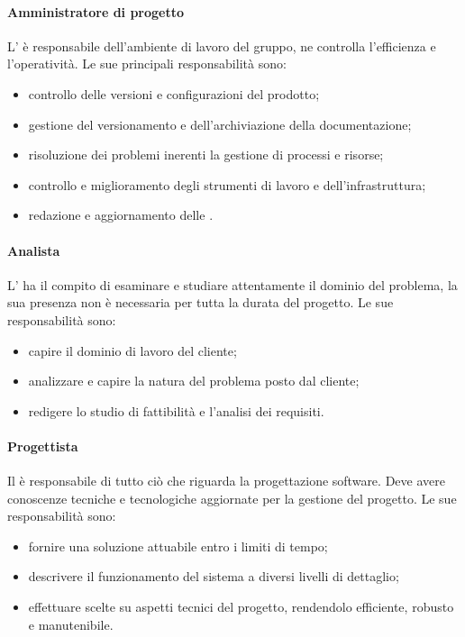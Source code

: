 			\paragraph{Amministratore di progetto}
			L'\amministratore{} è responsabile dell'ambiente di lavoro del gruppo, ne controlla l'efficienza e l'operatività.
			Le sue principali responsabilità sono:
			\begin{itemize}
				\item controllo delle versioni e configurazioni del prodotto;
				\item gestione del versionamento e dell'archiviazione della documentazione;
				\item risoluzione dei problemi inerenti la gestione di processi e risorse;
				\item controllo e miglioramento degli strumenti di lavoro e dell'infrastruttura;
				\item redazione e aggiornamento delle \ndp{}.
			\end{itemize}
			\paragraph{Analista}
			L'\analista{} ha il compito di esaminare e studiare attentamente il dominio del problema, la sua presenza non è necessaria per tutta la durata del progetto.
			Le sue responsabilità sono:
			\begin{itemize}
				\item capire il dominio di lavoro del cliente;
				\item analizzare e capire la natura del problema posto dal cliente;
				\item redigere lo studio di fattibilità e l'analisi dei requisiti.
			\end{itemize}
			\paragraph{Progettista}
			Il \progettista{} è responsabile di tutto ciò che riguarda la progettazione software. Deve avere conoscenze tecniche e tecnologiche aggiornate per la gestione del progetto.
			Le sue responsabilità sono:
			\begin{itemize}
				\item fornire una soluzione attuabile entro i limiti di tempo;
				\item descrivere il funzionamento del sistema a diversi livelli di dettaglio;
				\item effettuare scelte su aspetti tecnici del progetto, rendendolo efficiente, robusto e manutenibile.
			\end{itemize}

